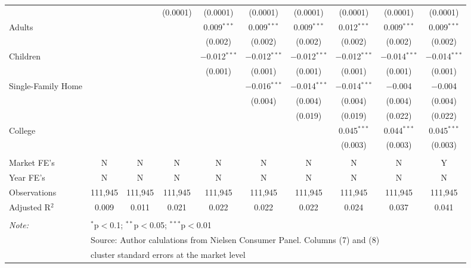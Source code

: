 \begin{table}[!htbp]
\begin{tabular}{@{\extracolsep{5pt}}lccccccccc}
  &  &  & (0.0001) & (0.0001) & (0.0001) & (0.0001) & (0.0001) & (0.0001) & (0.0001) \\ 
  Adults &  &  &  & 0.009$^{***}$ & 0.009$^{***}$ & 0.009$^{***}$ & 0.012$^{***}$ & 0.009$^{***}$ & 0.009$^{***}$ \\ 
  &  &  &  & (0.002) & (0.002) & (0.002) & (0.002) & (0.002) & (0.002) \\ 
  Children &  &  &  & $-$0.012$^{***}$ & $-$0.012$^{***}$ & $-$0.012$^{***}$ & $-$0.012$^{***}$ & $-$0.014$^{***}$ & $-$0.014$^{***}$ \\ 
  &  &  &  & (0.001) & (0.001) & (0.001) & (0.001) & (0.001) & (0.001) \\ 
  Single-Family Home &  &  &  &  & $-$0.016$^{***}$ & $-$0.014$^{***}$ & $-$0.014$^{***}$ & $-$0.004 & $-$0.004 \\ 
  &  &  &  &  & (0.004) & (0.004) & (0.004) & (0.004) & (0.004) \\ 
  &  &  &  &  &  & (0.019) & (0.019) & (0.022) & (0.022) \\ 
  College &  &  &  &  &  &  & 0.045$^{***}$ & 0.044$^{***}$ & 0.045$^{***}$ \\ 
  &  &  &  &  &  &  & (0.003) & (0.003) & (0.003) \\ 
 \hline \\[-1.8ex] 
Market FE's & N & N & N & N & N & N & N & N & Y \\ 
Year FE's & N & N & N & N & N & N & N & N & N \\ 
Observations & 111,945 & 111,945 & 111,945 & 111,945 & 111,945 & 111,945 & 111,945 & 111,945 & 111,945 \\ 
Adjusted R$^{2}$ & 0.009 & 0.011 & 0.021 & 0.022 & 0.022 & 0.022 & 0.024 & 0.037 & 0.041 \\ 
\hline 
\hline \\[-1.8ex] 
\textit{Note:}  & \multicolumn{9}{l}{$^{*}$p$<$0.1; $^{**}$p$<$0.05; $^{***}$p$<$0.01} \\ 
 & \multicolumn{9}{l}{Source: Author calulations from Nielsen Consumer Panel. Columns (7) and (8) } \\ 
 & \multicolumn{9}{l}{cluster standard errors at the market level} \\ 
\end{tabular} 
\end{table} 
